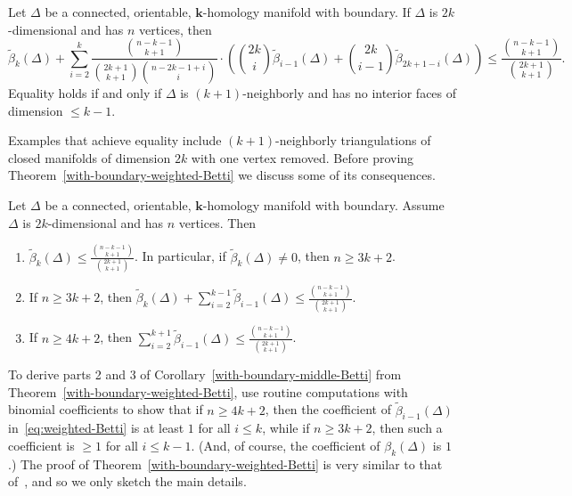 \documentclass[ALCO,ThmDefs,Unicode,epreuves]{cedram}
\newcommand{\field}{\mathbf{k}}
\begin{document}
\begin{theorem} \label{with-boundary-weighted-Betti}
Let $\Delta$ be a connected, orientable, $\field$-homology manifold with boundary. If $\Delta$ is $2k$-dimensional and has $n$ vertices, then 
\begin{equation} \label{eq:weighted-Betti}
\tilde{\beta}_k(\Delta)+\sum_{i=2}^k\frac{\binom{n-k-1}{k+1}}{{\binom{2k+1}{k+1}}{\binom{n-2k-1+i }{i}}} \cdot \left(\binom{2k}{i}\tilde{\beta}_{i-1}(\Delta) +\binom{2k}{i-1}\tilde{\beta}_{2k+1-i}(\Delta)\right)\leq \frac{\binom{n-k-1}{k+1}}{\binom{2k+1}{k+1}}.
\end{equation}
Equality holds if and only if $\Delta$ is $(k+1)$-neighborly and has no interior faces of dimension $\leq k-1$.
\end{theorem}
Examples that achieve equality include $(k+1)$-neighborly triangulations of closed manifolds of dimension $2k$ with one vertex removed. Before proving Theorem~\ref{with-boundary-weighted-Betti} we discuss some of its consequences.

\begin{coro} \label{with-boundary-middle-Betti}
Let $\Delta$ be a connected, orientable, $\field$-homology manifold with boundary. Assume $\Delta$ is $2k$-dimensional and has $n$ vertices. Then 
\begin{enumerate}
\item\label{coro6.5_1} $\tilde{\beta}_k(\Delta)\leq \frac{\binom{n-k-1}{k+1}}{\binom{2k+1}{k+1}}$. In particular, if $\tilde{\beta}_k(\Delta)\neq 0$, then $n\geq 3k+2$.
\item\label{coro6.5_2}  If $n\geq 3k+2$, then $\tilde{\beta}_k(\Delta)+\sum_{i=2}^{k-1}\tilde{\beta}_{i-1}(\Delta) \leq \frac{\binom{n-k-1}{k+1}}{\binom{2k+1}{k+1}}$.
\item\label{coro6.5_3}  If $n\geq 4k+2$, then $\sum_{i=2}^{k+1} \tilde{\beta}_{i-1}(\Delta)\leq \frac{\binom{n-k-1}{k+1}}{\binom{2k+1}{k+1}}$.
\end{enumerate}
\end{coro}

To derive parts 2 and 3 of Corollary~\ref{with-boundary-middle-Betti} from Theorem~\ref{with-boundary-weighted-Betti}, use routine computations with binomial coefficients to show that if $n\geq 4k+2$, then the coefficient of $\tilde{\beta}_{i-1}(\Delta)$ in~\eqref{eq:weighted-Betti} is at least $1$ for all $i\leq k$, while if $n\geq 3k+2$, then such a coefficient is $\geq 1$ for all $i\leq k-1$. (And, of course, the coefficient of $\beta_k(\Delta)$ is $1$.) The proof of Theorem~\ref{with-boundary-weighted-Betti} is very similar to that of~\cite[Theorem~4.4]{Novik-Swartz-09:Socles}, and so we only sketch the main details.
\end{document}
